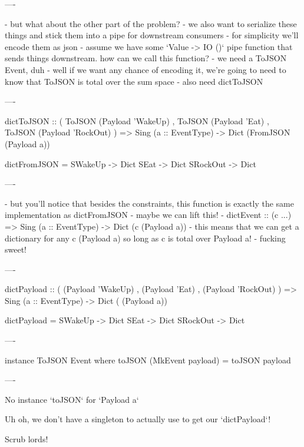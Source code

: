 ----

- but what about the other part of the problem?
  - we also want to serialize these things and stick them into a pipe for downstream consumers
  - for simplicity we'll encode them as json
  - assume we have some `Value -> IO ()` pipe function that sends things downstream. how can we call this function?
    - we need a ToJSON Event, duh
    - well if we want any chance of encoding it, we're going to need to know that ToJSON is total over the sum space
    - also need dictToJSON

----

\begin{hs}
  dictToJSON :: ( ToJSON (Payload 'WakeUp)
                , ToJSON (Payload 'Eat)
                , ToJSON (Payload 'RockOut)
                )
             => Sing (a :: EventType)
             -> Dict (FromJSON (Payload a))

  dictFromJSON = \case
    SWakeUp  -> Dict
    SEat     -> Dict
    SRockOut -> Dict
\end{hs}

----

- but you'll notice that besides the constraints, this function is exactly the same implementation as dictFromJSON
  - maybe we can lift this!
    - dictEvent :: (c ...) => Sing (a :: EventType) -> Dict (c (Payload a))
  - this means that we can get a dictionary for any c (Payload a) so long as c is total over Payload a!
    - fucking sweet!

----

\begin{raw}
  dictPayload :: (  (Payload 'WakeUp)
                 ,  (Payload 'Eat)
                 ,  (Payload 'RockOut)
                 )
              => Sing (a :: EventType)
              -> Dict ( (Payload a))

  dictPayload = \case
    SWakeUp  -> Dict
    SEat     -> Dict
    SRockOut -> Dict
\end{raw}

----

\begin{hs}
  instance ToJSON Event where
    toJSON (MkEvent payload) = toJSON payload
\end{hs}

----

No instance `toJSON` for `Payload a`

Uh oh, we don't have a singleton to actually use to get our `dictPayload`!

Scrub lords!

